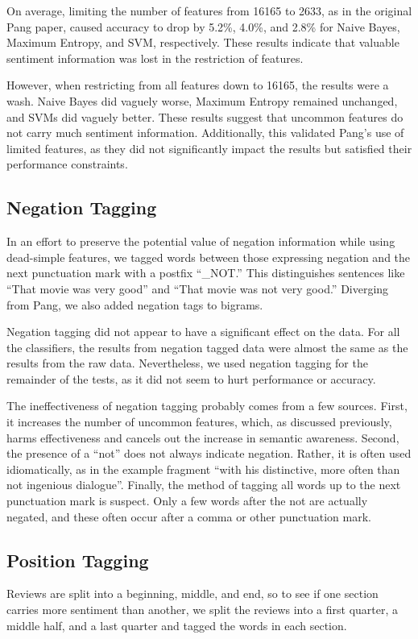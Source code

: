 \documentclass[10pt,twocolumn,letterpaper]{article}
\begin{document}
On average, limiting the number of features from 16165 to 2633, as in the original Pang paper, caused accuracy to drop by 5.2\%, 4.0\%, and 2.8\% for Naive Bayes, Maximum Entropy, and SVM, respectively. These results indicate that valuable sentiment information was lost in the restriction of features. 

However, when restricting from all features down to 16165, the results were a wash. Naive Bayes did vaguely worse, Maximum Entropy remained unchanged, and SVMs did vaguely better. These results suggest that uncommon features do not carry much sentiment information. Additionally, this validated Pang’s use of limited features, as they did not significantly impact the results but satisfied their performance constraints.

\subsection{Negation Tagging}

In an effort to preserve the potential value of negation information while using dead-simple features, we tagged words between those expressing negation and the next punctuation mark with a postfix ``\_NOT.'' This distinguishes sentences like ``That movie was very good'' and ``That movie was not very good.'' Diverging from Pang, we also added negation tags to bigrams.

Negation tagging did not appear to have a significant effect on the data. For all the classifiers, the results from negation tagged data were almost the same as the results from the raw data. Nevertheless, we used negation tagging for the remainder of the tests, as it did not seem to hurt performance or accuracy. 

The ineffectiveness of negation tagging probably comes from a few sources. First, it increases the number of uncommon features, which, as discussed previously, harms effectiveness and cancels out the increase in semantic awareness. Second, the presence of a “not” does not always indicate negation. Rather, it is often used idiomatically, as in the example fragment ``with his distinctive, more often than not ingenious dialogue''. Finally, the method of tagging all words up to the next punctuation mark is suspect. Only a few words after the not are actually negated, and these often occur after a comma or other punctuation mark.

\subsection{Position Tagging}
Reviews are split into a beginning, middle, and end, so to see if one section carries more sentiment than another, we split the reviews into a first quarter, a middle half, and a last quarter and tagged the words in each section.
\end{document}
